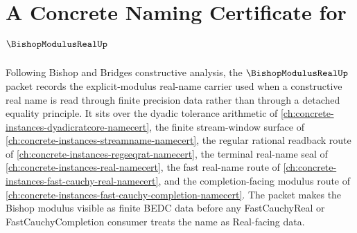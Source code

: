 \chapter{A Concrete Naming Certificate for $\BishopModulusRealUp$}
\label{ch:concrete-instances-bishop-modulus-real-namecert}

Following Bishop and Bridges constructive analysis, the $\BishopModulusRealUp$ packet records the explicit-modulus real-name carrier used when a constructive real name is read through finite precision data rather than through a detached equality principle. It sits over the dyadic tolerance arithmetic of \autoref{ch:concrete-instances-dyadicratcore-namecert}, the finite stream-window surface of \autoref{ch:concrete-instances-streamname-namecert}, the regular rational readback route of \autoref{ch:concrete-instances-regseqrat-namecert}, the terminal real-name seal of \autoref{ch:concrete-instances-real-namecert}, the fast real-name route of \autoref{ch:concrete-instances-fast-cauchy-real-namecert}, and the completion-facing modulus route of \autoref{ch:concrete-instances-fast-cauchy-completion-namecert}. The packet makes the Bishop modulus visible as finite BEDC data before any FastCauchyReal or FastCauchyCompletion consumer treats the name as Real-facing data.

